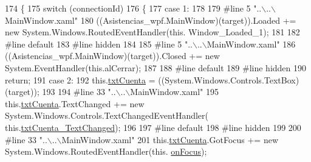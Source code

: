 \begin{DoxyCode}
174                                                                                                 \{
175             \textcolor{keywordflow}{switch} (connectionId)
176             \{
177             \textcolor{keywordflow}{case} 1:
178             
179 \textcolor{preprocessor}{            #line 5 "..\(\backslash\)..\(\backslash\)MainWindow.xaml"}
180 \textcolor{preprocessor}{}            ((Asistencias\_wpf.MainWindow)(target)).Loaded += \textcolor{keyword}{new} System.Windows.RoutedEventHandler(\textcolor{keyword}{this}.
      Window\_Loaded\_1);
181             
182 \textcolor{preprocessor}{            #line default}
183 \textcolor{preprocessor}{}\textcolor{preprocessor}{            #line hidden}
184 \textcolor{preprocessor}{}            
185 \textcolor{preprocessor}{            #line 5 "..\(\backslash\)..\(\backslash\)MainWindow.xaml"}
186 \textcolor{preprocessor}{}            ((Asistencias\_wpf.MainWindow)(target)).Closed += \textcolor{keyword}{new} System.EventHandler(\textcolor{keyword}{this}.alCerrar);
187             
188 \textcolor{preprocessor}{            #line default}
189 \textcolor{preprocessor}{}\textcolor{preprocessor}{            #line hidden}
190 \textcolor{preprocessor}{}            \textcolor{keywordflow}{return};
191             \textcolor{keywordflow}{case} 2:
192             this.\hyperlink{class_asistencias__wpf_1_1_main_window_a52e76fc15be974c00138b13ab7e19b44}{txtCuenta} = ((System.Windows.Controls.TextBox)(target));
193             
194 \textcolor{preprocessor}{            #line 33 "..\(\backslash\)..\(\backslash\)MainWindow.xaml"}
195 \textcolor{preprocessor}{}            this.\hyperlink{class_asistencias__wpf_1_1_main_window_a52e76fc15be974c00138b13ab7e19b44}{txtCuenta}.TextChanged += \textcolor{keyword}{new} System.Windows.Controls.TextChangedEventHandler(
      this.\hyperlink{class_asistencias__wpf_1_1_main_window_af16b10485e73a8cc0c7cef9d26983798}{txtCuenta\_TextChanged});
196             
197 \textcolor{preprocessor}{            #line default}
198 \textcolor{preprocessor}{}\textcolor{preprocessor}{            #line hidden}
199 \textcolor{preprocessor}{}            
200 \textcolor{preprocessor}{            #line 33 "..\(\backslash\)..\(\backslash\)MainWindow.xaml"}
201 \textcolor{preprocessor}{}            this.\hyperlink{class_asistencias__wpf_1_1_main_window_a52e76fc15be974c00138b13ab7e19b44}{txtCuenta}.GotFocus += \textcolor{keyword}{new} System.Windows.RoutedEventHandler(this.
      \hyperlink{class_asistencias__wpf_1_1_main_window_acb5ec5ec33907eb146447f12fcd18d94}{onFocus});

\end{DoxyCode}
